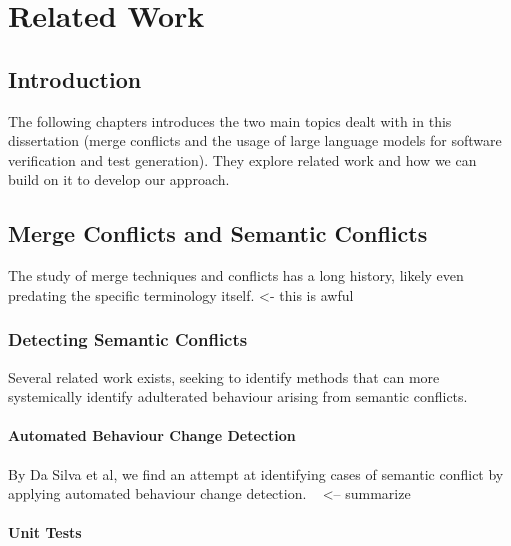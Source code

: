 \chapter{Related Work} \label{chap:sota}

\section{Introduction}

 The following chapters introduces the two main topics dealt with in this dissertation (merge conflicts and the usage of large language models for software verification and test generation). They explore related work and how we can build on it to develop our approach.

\section{Merge Conflicts and Semantic Conflicts}

The study of merge techniques and conflicts has a long history, likely even predating the specific terminology itself. <- this is awful

\subsection{Detecting Semantic Conflicts}

Several related work exists, seeking to identify methods that can more systemically identify adulterated behaviour arising from semantic conflicts.

\subsubsection{Automated Behaviour Change Detection}

By Da Silva et al, we find an attempt at identifying cases of semantic conflict by applying automated behaviour change detection. ~\citep{kn:leuson} <-- summarize



\subsubsection{Unit Tests}


